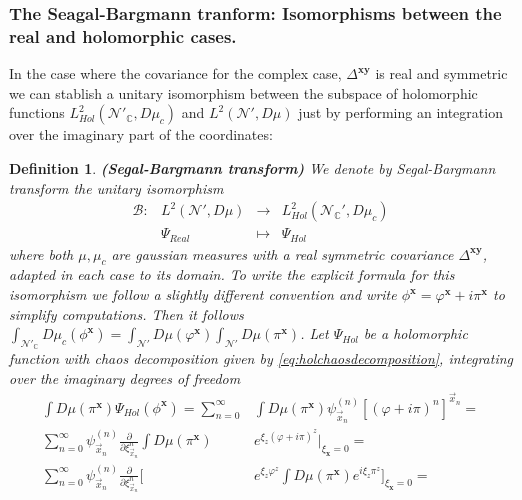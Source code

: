 \documentclass[12pt]{article}%
\newtheorem{definition}{Definition}%
\begin{document}
    \subsubsection{The Seagal-Bargmann tranform: Isomorphisms between the real and holomorphic cases.}
    In the case where the covariance for the complex case, $\Delta^{\mathbf{xy}}$ is real and symmetric we can stablish a unitary isomorphism between the subspace of holomorphic functions $L^2_{Hol}(\mathcal{N}'_{\mathbb{C}},D\mu_c)$ and  $L^2(\mathcal{N}',D\mu)$ just by performing an integration over the imaginary part of the coordinates:    


    \begin{definition}
        \label{def:Segaltranf}{\bf (Segal-Bargmann transform)} We denote by Segal-Bargmann transform the unitary isomorphism
        $$
        \begin{array}{cccc}
        \mathcal{B} :&  L^2(\mathcal{N}',D\mu)  & \longrightarrow &  L_{Hol}^2(\mathcal{N}_{\mathbb{C}}',D\mu_c) \\ 
         & \Psi_{Real} &\longmapsto & \Psi_{Hol}  
        \end{array}
        $$
        where both $\mu,\mu_c$ are gaussian measures with a real symmetric covariance $\Delta^{\mathbf{xy}}$, adapted in each case to its domain. To write the explicit formula for this isomorphism we follow a slightly different convention and write $\phi^\mathbf{x}=\varphi^\mathbf{x}+i\pi^\mathbf{x}$ to simplify computations. Then it follows   $\int_{\mathcal{N}'_\mathbb{C}} D\mu_c(\phi^{\mathbf{x}})=\int_{\mathcal{N}'} D\mu(\varphi^{\mathbf{x}})\int_{\mathcal{N}'} D\mu(\pi^{\mathbf{x}})$. Let $\Psi_{Hol}$ be a holomorphic function with chaos decomposition given by \eqref{eq:holchaosdecomposition}, integrating over the imaginary degrees of freedom 
    \begin{equation*}
        \label{eq:schHolrelation}
        \begin{split}
        \int D\mu(\pi^{\mathbf{x}})\Psi_{Hol}(\phi^\mathbf{x})=
        \sum_{n=0}^\infty &\int D\mu(\pi^{\mathbf{x}}) \psi^{(n)}_{\vec{x}_n}{[(\varphi+%
        i\pi)^n]^{\vec{x}_n}}=
        \\
        \sum_{n=0}^\infty  \psi^{(n)}_{\vec{x}_n}\frac{\partial}{\partial \xi^n_{\vec{x}_n}}\int D\mu(\pi^{\mathbf{x}})& e^{\xi_z(\varphi+i\pi)^z}\bigg\lvert_{\xi_{\mathbf{x}}=0}= 
        \\
        \sum_{n=0}^\infty  \psi^{(n)}_{\vec{x}_n}
        \frac{\partial}{\partial \xi^n_{\vec{x}_n}}\Bigg[&   e^{{\xi_z\varphi^z} } \int D\mu(\pi^{\mathbf{x}}) e^{i{\xi_z\pi^z}}\Bigg]_{\xi_{\mathbf{x}}=0}= 

\end{split}
\end{equation*}
\end{definition}
\end{document}
